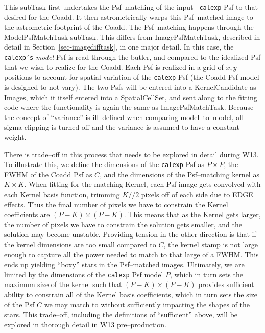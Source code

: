 \documentclass[12pt]{article}
\begin{document}
This subTask first undertakes the Psf--matching of the input {\tt
  calexp} Psf to that desired for the Coadd.  It then astrometrically
warps this Psf--matched image to the astrometric footprint of the
Coadd.  The Psf--matching happens through the ModelPsfMatchTask
subTask.  This differs from ImagePsfMatchTask, described in detail in
Section~\ref{sec-imagedifftask}, in one major detail.  In this case,
the {\tt calexp's} {\it model} Psf is read through the butler, and
compared to the idealized Psf that we wish to realize for the Coadd.
Each Psf is realized in a grid of $x,y$ positions to account for
spatial variation of the {\tt calexp} Psf (the Coadd Psf model is
designed to not vary).  The two Psfs will be entered into a
KernelCandidate as Images, which it itself entered into a
SpatialCellSet, and sent along to the fitting code where the
functionality is again the same as ImagePsfMatchTask.  Because the
concept of ``variance'' is ill--defined when comparing
model--to--model, all sigma clipping is turned off and the variance is
assumed to have a constant weight.

There is trade--off in this process that needs to be explored in
detail during W13.  To illustrate this, we define the dimensions of
the {\tt calexp} Psf as $P \times P$, the FWHM of the Coadd Psf as
$C$, and the dimensions of the Psf--matching kernel as $K \times K$.
When fitting for the matching Kernel, each Psf image gets convolved
with each Kernel basis function, trimming $K//2$ pixels off of each
side due to EDGE effects.  Thus the final number of pixels we have to
constrain the Kernel coefficients are $(P-K) \times (P-K)$.  This
means that as the Kernel gets larger, the number of pixels we have to
constrain the solution gets smaller, and the solution may become
unstable.  Providing tension in the other direction is that if the
kernel dimensions are too small compared to $C$, the kernel stamp is
not large enough to capture all the power needed to match to that
large of a FWHM.  This ends up yielding ``boxy'' stars in the
Psf--matched images.  Ultimately, we are limited by the dimensions of
the {\tt calexp} Psf model $P$, which in turn sets the maximum size of
the kernel such that $(P-K) \times (P-K)$ provides sufficient ability
to constrain all of the Kernel basis coefficients, which in turn sets
the size of the Psf $C$ we may match to without sufficiently impacting
the shapes of the stars.  This trade--off, including the definitions
of ``sufficient'' above, will be explored in thorough detail in W13
pre--production.
\end{document}
